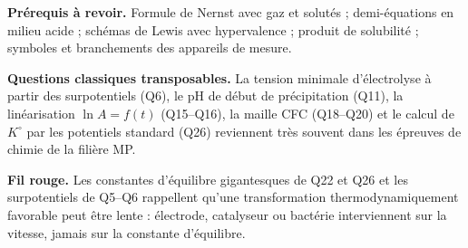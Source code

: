 \documentclass[11pt,a4paper]{article}
\begin{document}
\textbf{Prérequis à revoir.} Formule de Nernst avec gaz et solutés ; demi-équations en milieu acide ; schémas de Lewis avec hypervalence ; produit de solubilité ; symboles et branchements des appareils de mesure.

\textbf{Questions classiques transposables.} La tension minimale d'électrolyse à partir des surpotentiels (Q6), le pH de début de précipitation (Q11), la linéarisation \(\ln A=f(t)\) (Q15--Q16), la maille CFC (Q18--Q20) et le calcul de \(K^\circ\) par les potentiels standard (Q26) reviennent très souvent dans les épreuves de chimie de la filière MP.

\textbf{Fil rouge.} Les constantes d'équilibre gigantesques de Q22 et Q26 et les surpotentiels de Q5--Q6 rappellent qu'une transformation thermodynamiquement favorable peut être lente : électrode, catalyseur ou bactérie interviennent sur la vitesse, jamais sur la constante d'équilibre.
\end{document}
